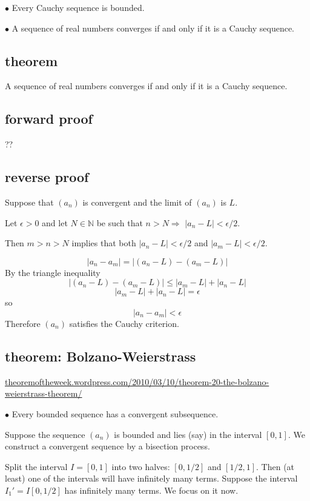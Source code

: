 \documentclass[11pt, oneside]{article}
\begin{document}
$\bullet$  Every Cauchy sequence is bounded.

$\bullet$  A sequence of real numbers converges if and only if it is a Cauchy sequence.

\subsection*{theorem}

A sequence of real numbers converges if and only if it is a Cauchy sequence.

\subsection*{forward proof} 
??

\subsection*{reverse proof} 

Suppose that $(a_n)$ is convergent and the limit of $(a_n)$ is $L$.  

Let $\epsilon > 0$ and let $N \in \mathbb{N}$ be such that $n > N \Rightarrow$ $| a_n - L | < \epsilon / 2$.

Then $m > n > N$ implies that both $|a_n - L| < \epsilon / 2$ and $|a_m - L| < \epsilon / 2$.

\[ |a_n - a_m| = |(a_n - L) - (a_m - L)| \]
By the triangle inequality
\[ |(a_n - L) - (a_m - L)| \le | a_m - L | + | a_n - L | \]
\[ | a_m - L | + | a_n - L | = \epsilon \]
so
\[ |a_n - a_m| <  \epsilon \]
Therefore $(a_n)$ satisfies the Cauchy criterion.

\subsection*{theorem:  Bolzano-Weierstrass}

\url{theoremoftheweek.wordpress.com/2010/03/10/theorem-20-the-bolzano-weierstrass-theorem/}

$\bullet$  Every bounded sequence has a convergent subsequence.

Suppose the sequence $(a_n)$ is bounded and lies (say) in the interval $[0,1]$.  We construct a convergent sequence by a bisection process.  

Split the interval $I = [0,1]$ into two halves:  $[0,1/2]$ and $[1/2,1]$.  Then (at least) one of the intervals will have infinitely many terms.  Suppose the interval $I_1' = I[0,1/2]$ has infinitely many terms.  We focus on it now.
\end{document}
